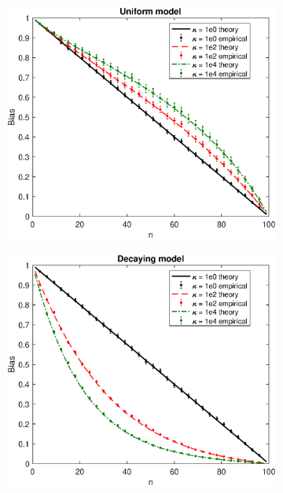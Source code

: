 \documentclass[11pt]{article}
\begin{document}
\begin{figure}[H]
\centering
\begin{subfigure}[t]{0.48\textwidth}
    \includegraphics[width=\textwidth]{figs/implicit/implicit_bias_uniform}
  \caption{}
\end{subfigure}
\hfill
\begin{subfigure}[t]{0.48\textwidth}
    \includegraphics[width=\textwidth]{figs/implicit/implicit_bias_decaying}

\end{subfigure}
\end{figure}
\end{document}
